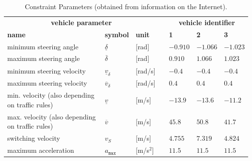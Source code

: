 \documentclass[11pt,a4paper]{article}
\renewcommand{\^}[1]{^{(#1)}}
\begin{document}
\begin{table}[h]
\caption{Constraint Parameters (obtained from information on the Internet). }
{\small
\begin{center}\label{tab:constraintParameters}
\begin{tabular}{lllclll}
	\toprule
	\multicolumn{3}{c}{\textbf{vehicle parameter}} & \phantom{a} & \multicolumn{3}{c}{\textbf{vehicle identifier}} \\ \cmidrule{1-3} \cmidrule{5-7} 
	\textbf{name} & \textbf{symbol} & \textbf{unit} && \textbf{1} & \textbf{2} & \textbf{3}  \\ \hline
	minimum steering angle & $\underline{\delta}$ & [rad] && $-0.910$ & $-1.066$ & $-1.023$ \\ 
	maximum steering angle & $\overline{\delta}$ & [rad] && $0.910$ & $1.066$ & $1.023$ \\ 
	minimum steering velocity & $\underline{v}_\delta$ & [rad/s] && $-0.4$ & $-0.4$ & $-0.4$ \\ 
	maximum steering velocity & $\overline{v}_\delta$ & [rad/s] && $0.4$ & $0.4$ & $0.4$ \\ 
	min. velocity (also depending on traffic rules) & $\underline{v}$ & [m/s] && $-13.9$ & $-13.6$ & $-11.2$ \\ 
	max. velocity (also depending on traffic rules) & $\overline{v}$ & [m/s] && $45.8$ & $50.8$ & $41.7$ \\ 
	switching velocity & $v_S$ & [m/s] && $4.755$ & $7.319$ & $4.824$ \\ 
	maximum acceleration & $a_\mathtt{max}$ & [m/s$^2$] && $11.5$ & $11.5$ & $11.5$ \\
	\bottomrule 
\end{tabular}
\end{center}}
\end{table}

\end{document}
